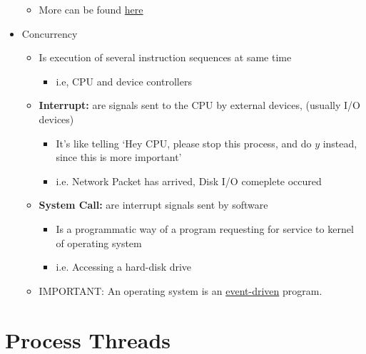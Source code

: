 \documentclass[12pt]{article}
\begin{document}
\begin{itemize}
\begin{itemize}
\begin{itemize}
        \end{itemize}
        \item More can be found \href{https://www.youtube.com/watch?v=Zr8WKIOIKsk}{here}
    \end{itemize}
    \item Concurrency
    \begin{itemize}
        \item Is execution of several instruction sequences at same time
        \begin{itemize}
            \item i.e, CPU and device controllers
        \end{itemize}
        \item \textbf{Interrupt:} are signals sent to the CPU by external devices,
        (usually I/O devices)
        \begin{itemize}
            \item It's like telling `Hey CPU, please stop this process, and do $y$
            instead, since this is more important'
            \item i.e. Network Packet has arrived, Disk I/O comeplete
            occured
        \end{itemize}
        \item \textbf{System Call:} are interrupt signals sent by software
        \begin{itemize}
            \item Is a programmatic way of a program requesting for service to
            kernel of operating system
            \item i.e. Accessing a hard-disk drive
        \end{itemize}
        \item IMPORTANT: An operating system is an \underline{event-driven} program.
    \end{itemize}
\end{itemize}

\bigskip

\section{Process Threads}

\bigskip
\end{document}
